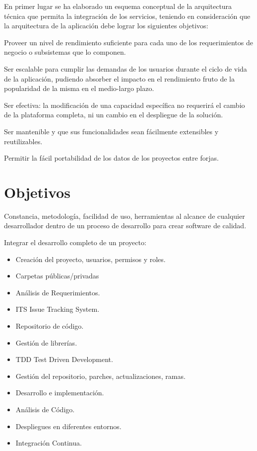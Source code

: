 \documentclass[11pt]{scrartcl}
\begin{document}
En primer lugar se ha elaborado un esquema conceptual de la arquitectura técnica que
permita la integración de los servicios, teniendo en consideración que la arquitectura de la
aplicación debe lograr los siguientes objetivos:

Proveer un nivel de rendimiento suficiente para cada uno de los requerimientos de
   negocio o subsistemas que lo componen.

Ser escalable para cumplir las demandas de los usuarios durante el ciclo de vida de la
   aplicación, pudiendo absorber el impacto en el rendimiento fruto de la popularidad de la
   misma en el medio-largo plazo.

Ser efectiva: la modificación de una capacidad específica no requerirá el cambio de la
      plataforma completa, ni un cambio en el despliegue de la solución.

Ser mantenible y que sus funcionalidades sean fácilmente extensibles y reutilizables.

Permitir la fácil portabilidad de los datos de los proyectos entre forjas.


\section{Objetivos}
\label{sec:objetivos}

\par Constancia, metodolog\'ia, facilidad de uso, herramientas al alcance de cualquier desarrollador dentro de un proceso de desarrollo para crear software de calidad.

\par Integrar el desarrollo completo de un proyecto:

\begin{itemize}
	\item Creación del proyecto, usuarios, permisos y roles.
	\item Carpetas públicas/privadas
	\item Análisis de Requerimientos.
	\item ITS Issue Tracking System.
	\item Repositorio de código.
	\item Gestión de librerías.
	\item TDD Test Driven Development.
	\item Gestión del repositorio, parches, actualizaciones, ramas.
	\item Desarrollo e implementación.
	\item Análisis de Código.
	\item Despliegues en diferentes entornos.
	\item Integración Continua.
\end{itemize}
\end{document}
